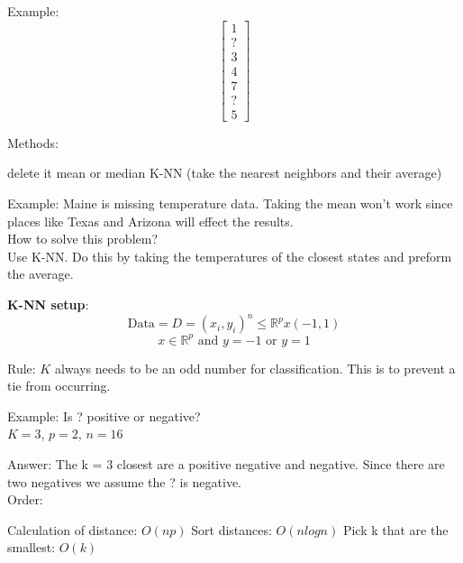 Example:
\[
    \begin{bmatrix}
        1 \\
        ? \\
        3 \\
        4 \\
        7 \\
        ? \\
        5
    \end{bmatrix}
\] 

Methods:
\begin{outline}[enumerate]
    \1 delete it 
    \1 mean or median 
    \1 K-NN (take the nearest neighbors and their average)
\end{outline}

Example: Maine is missing temperature data. Taking the mean won't work since places like Texas and Arizona will effect the results. \\

How to solve this problem? \\
Use K-NN. Do this by taking the temperatures of the closest states and preform the average. 

\textbf{K-NN setup}: 
\[
    \textrm{Data} = D ={(x_i,y_i)}^n \leq \mathbb{R}^px(-1,1)
\]
\[
    x\in \mathbb{R}^p \textrm{ and } y=-1 \textrm{ or } y=1
\]

Rule:
$K$ always needs to be an odd number for classification. This is to prevent a tie from occurring.

Example: Is ? positive or negative? \\
$K = 3$, $p = 2$, $n = 16$


Answer: The k = 3 closest are a positive negative and negative. Since there are two negatives we assume the ? is negative. \\

Order:
\begin{outline}
    \1 Calculation of distance: $O(np)$
    \1 Sort distances: $O(n log n)$
    \1 Pick k that are the smallest: $O(k)$
\end{outline}

